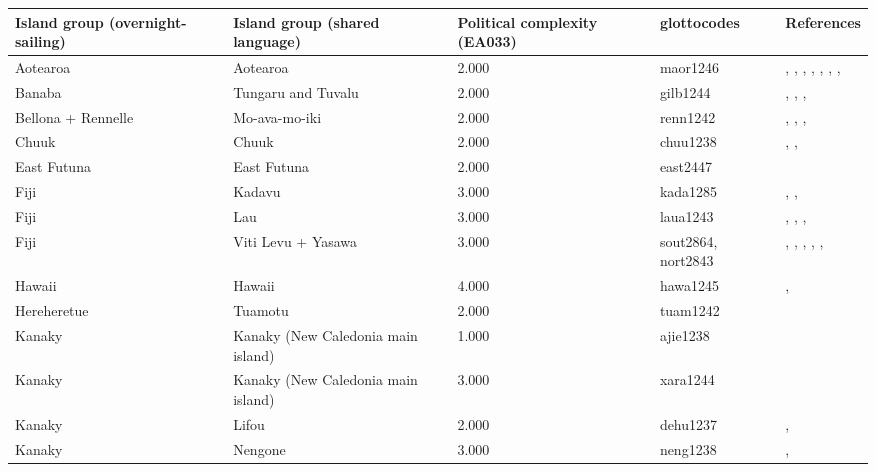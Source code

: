 \begin{longtable}{p{1.8cm}p{1.8cm}p{1.8cm}p{2cm}p{7cm}}
  \toprule
Island group (overnight-sailing) & Island group (shared language) & Political complexity (EA033) & glottocodes & References \\ 
  \midrule
Aotearoa & Aotearoa & 2.000 & maor1246 & \citet{sahlins1958social}, \citet{sahlins1958social}, \citet{buck1952}, \citet{buck1952}, \citet{kirch1984evolution}, \citet{kirch1984evolution}, \citet{van1995maori}, \citet{van1995maori} \\ 
  Banaba & Tungaru and Tuvalu & 2.000 & gilb1244 & \citet{lambert1966}, \citet{lambert1975makin}, \citet{lambert1991}, \citet{macdonald1982cinderellas} \\ 
  Bellona + Rennelle & Mo-ava-mo-iki & 2.000 & renn1242 & \citet{birketsmith1956}, \citet{birketsmith1956}, \citet{monberg1991bellona}, \citet{monberg1991bellona} \\ 
  Chuuk & Chuuk & 2.000 & chuu1238 & \citet{goodenough1991}, \citet{goodenough2002under}, \citet{mahony1960taro} \\ 
  East Futuna & East Futuna & 2.000 & east2447 & \citet{kirch1994wet} \\ 
  Fiji & Kadavu & 3.000 & kada1285 & \citet{kuhlken2002intensive}, \citet{scarr1984fiji}, \citet{walter1978examination} \\ 
  Fiji & Lau & 3.000 & laua1243 & \citet{hocart_1929}, \citet{quain_1948}, \citet{thompson1940a}, \citet{thompson1940b} \\ 
  Fiji & Viti Levu + Yasawa & 3.000 & sout2864, nort2843 & \citet{kuhlken2002intensive}, \citet{kuhlken2002intensive}, \citet{scarr1984fiji}, \citet{scarr1984fiji}, \citet{walter1978examination}, \citet{walter1978examination} \\ 
  Hawaii & Hawaii & 4.000 & hawa1245 & \citet{kirch1994wet}, \citet{kirch2010chiefs} \\ 
  Hereheretue & Tuamotu & 2.000 & tuam1242 & \citet{emory1975material} \\ 
  Kanaky & Kanaky (New Caledonia main island) & 1.000 & ajie1238 & \citet{winslow1991} \\ 
  Kanaky & Kanaky (New Caledonia main island) & 3.000 & xara1244 & \citet{young1991goodenough} \\ 
  Kanaky & Lifou & 2.000 & dehu1237 & \citet{hadfield_1920}, \citet{ray1917people} \\ 
  Kanaky & Nengone & 3.000 & neng1238 & \citet{dubois1984gens}, \citet{guiart1952organisation} \\ 

\end{longtable}
